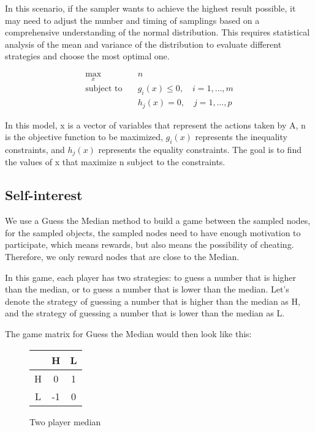 \documentclass[twocolumn]{article}
\begin{document}
In this scenario, if the sampler wants to achieve the highest result possible, it may need to adjust the number and timing of samplings based on a comprehensive understanding of the normal distribution. This requires statistical analysis of the mean and variance of the distribution to evaluate different strategies and choose the most optimal one.

\begin{align}
  \max_x \quad & n \\
  \text{subject to} \quad & g_i(x) \leq 0, \quad i = 1, \dots, m \\
  & h_j(x) = 0, \quad j = 1, \dots, p
\end{align}

In this model, x is a vector of variables that represent the actions taken by A, n is the objective function to be maximized, $g_i(x)$ represents the inequality constraints, and $h_j(x)$ represents the equality constraints. The goal is to find the values of x that maximize n subject to the constraints.

\subsection{Self-interest}
We use a Guess the Median\cite{game_theory} method to build a game between the sampled nodes, for the sampled objects, the sampled nodes need to have enough motivation to participate, which means rewards, but also means the possibility of cheating. Therefore, we only reward nodes that are close to the Median.

In this game, each player has two strategies: to guess a number that is higher than the median, or to guess a number that is lower than the median. Let's denote the strategy of guessing a number that is higher than the median as H, and the strategy of guessing a number that is lower than the median as L.

The game matrix for Guess the Median would then look like this:

\begin{figure}[htbp]
  \begin{center}
\begin{tabular}{c|c|c}
 & H & L \\ \hline
H & 0 & 1 \\ \hline
L & -1 & 0
\end{tabular}
  \end{center}

\caption{Two player median}
\end{figure}
\end{document}
